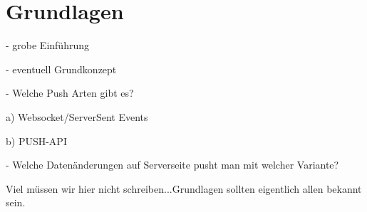 \chapter{Grundlagen}

- grobe Einführung 

- eventuell Grundkonzept

- Welche Push Arten gibt es?

  a) Websocket/ServerSent Events
  
  b) PUSH-API

- Welche Datenänderungen auf Serverseite pusht man mit welcher Variante?

Viel müssen wir hier nicht schreiben...Grundlagen sollten eigentlich allen bekannt sein.